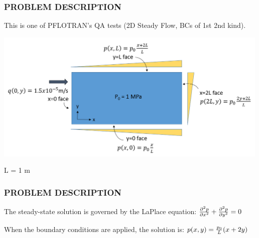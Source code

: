 \documentclass{beamer}
\begin{document}
\begin{frame}\frametitle{PROBLEM DESCRIPTION}

This is one of PFLOTRAN's QA tests (2D Steady Flow, BCs of 1st 2nd kind).

\includegraphics[width=1.2\textheight]{./BC_schematic.png}

L = 1 m

\end{frame}

\begin{frame}\frametitle{PROBLEM DESCRIPTION}

The steady-state solution is governed by the LaPlace equation:
\Large 
\vspace{0.25 in}
${{\partial^{2} p} \over {\partial x^{2}}} + {{\partial^{2} p} \over {\partial y^{2}}} = 0$ 
  
\vspace{0.50 in}  
\normalsize  
When the boundary conditions are applied, the solution is:
\Large 
\vspace{0.25 in}
$p(x,y) = {p_0 \over L} (x+2y)$

\end{frame}
\end{document}
